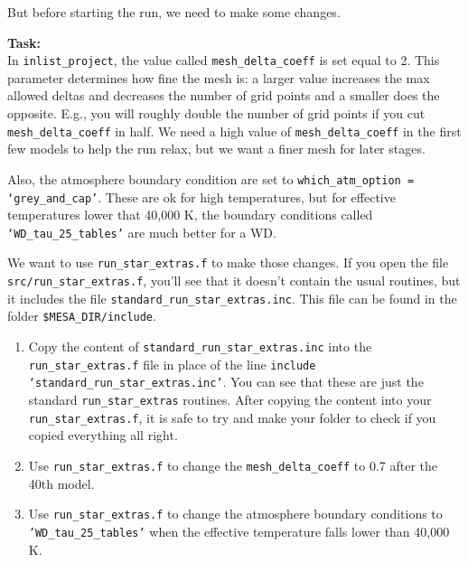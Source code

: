 \documentclass{article}
\begin{document}
But before starting the run, we need to make some changes.

\textbf{Task:} \\ 
In \texttt{inlist\_project}, the value called \texttt{mesh\_delta\_coeff} is set equal to 2. This parameter determines how fine the mesh is: a larger value increases the max allowed deltas and decreases the number of grid points and a smaller does the opposite. E.g., you will roughly double the number of grid points if you cut \texttt{mesh\_delta\_coeff} in half. We need a high value of \texttt{mesh\_delta\_coeff} in the first few models to help the run relax, but we want a finer mesh for later stages.

Also, the atmosphere boundary condition are set to \texttt{which\_atm\_option = `grey\_and\_cap'}. These are ok for high temperatures, but for effective temperatures lower that 40,000 K, the boundary conditions called \texttt{`WD\_tau\_25\_tables'} are much better for a WD.

We want to use \texttt{run\_star\_extras.f} to make those changes. If you open the file \texttt{src/run\_star\_extras.f}, you'll see that it doesn't contain the usual routines, but it includes the file \texttt{standard\_run\_star\_extras.inc}. This file can be found in the folder \texttt{\$MESA\_DIR/include}.

\begin{enumerate}
    \item Copy the content of \texttt{standard\_run\_star\_extras.inc} into the \texttt{run\_star\_extras.f} file in place of the line \texttt{include `standard\_run\_star\_extras.inc'}. You can see that these are just the standard \texttt{run\_star\_extras} routines. After copying the content into your \texttt{run\_star\_extras.f}, it is safe to try and make your folder to check if you copied everything all right.
    \item Use \texttt{run\_star\_extras.f} to change the \texttt{mesh\_delta\_coeff} to 0.7 after the 40th model.
    \item Use \texttt{run\_star\_extras.f} to change the atmosphere boundary conditions to \texttt{'WD\_tau\_25\_tables'} when the effective temperature falls lower than 40,000 K.
\end{enumerate}

\end{document}
